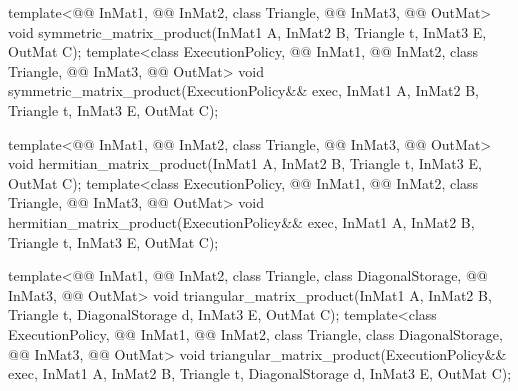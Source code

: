 \begin{itemdecl}
template<@@ InMat1, @@ InMat2, class Triangle, @@ InMat3,
         @@ OutMat>
  void symmetric_matrix_product(InMat1 A, InMat2 B, Triangle t, InMat3 E, OutMat C);
template<class ExecutionPolicy,
         @@ InMat1, @@ InMat2, class Triangle, @@ InMat3,
         @@ OutMat>
  void symmetric_matrix_product(ExecutionPolicy&& exec,
                                InMat1 A, InMat2 B, Triangle t, InMat3 E, OutMat C);

template<@@ InMat1, @@ InMat2, class Triangle, @@ InMat3,
         @@ OutMat>
  void hermitian_matrix_product(InMat1 A, InMat2 B, Triangle t, InMat3 E, OutMat C);
template<class ExecutionPolicy,
         @@ InMat1, @@ InMat2, class Triangle, @@ InMat3,
         @@ OutMat>
  void hermitian_matrix_product(ExecutionPolicy&& exec,
                                InMat1 A, InMat2 B, Triangle t, InMat3 E, OutMat C);

template<@@ InMat1, @@ InMat2, class Triangle, class DiagonalStorage,
         @@ InMat3, @@ OutMat>
  void triangular_matrix_product(InMat1 A, InMat2 B, Triangle t, DiagonalStorage d, InMat3 E,
                                 OutMat C);
template<class ExecutionPolicy,
         @@ InMat1, @@ InMat2, class Triangle, class DiagonalStorage,
         @@ InMat3, @@ OutMat>
  void triangular_matrix_product(ExecutionPolicy&& exec,
                                 InMat1 A, InMat2 B, Triangle t, DiagonalStorage d, InMat3 E,
                                 OutMat C);
\end{itemdecl}

